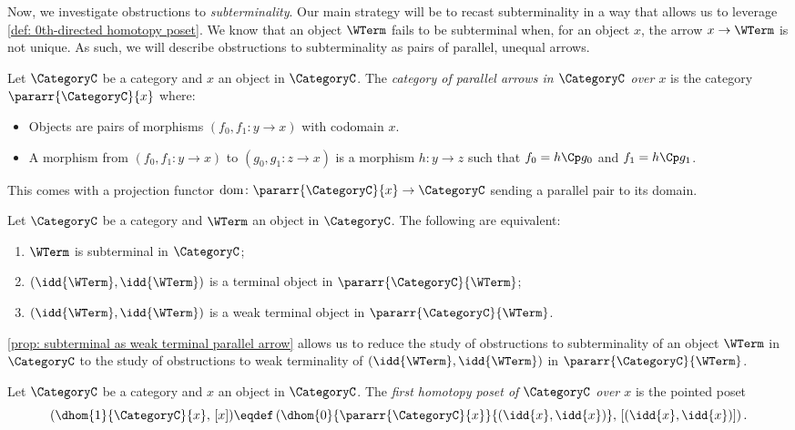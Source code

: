 Now, we investigate obstructions to \emph{subterminality}.
Our main strategy will be to recast subterminality in a way that allows us to leverage \autoref{def: 0th-directed homotopy poset}.
We know that an object $\WTerm$ fails to be subterminal when, for an object $x$, the arrow $x \to \WTerm$ is not unique.
As such, we will describe obstructions to subterminality as pairs of parallel, unequal arrows.
%
%
\begin{definition}\label{def: category of parallel arrows}
    Let $\CategoryC$ be a category and $x$ an object in $\CategoryC$.
    The \emph{category of parallel arrows in $\CategoryC$ over $x$} is the category $\pararr{\CategoryC}{x}$ where:
    \begin{itemize}
        \item Objects are pairs of morphisms $(f_0, f_1\colon y \to x)$ with codomain $x$.
        \item A morphism from $(f_0, f_1\colon y \to x)$ to $(g_0, g_1\colon z \to x)$ is a morphism $h\colon y \to z$ such that $f_0 = h\Cp g_0$ and $f_1 = h\Cp g_1$.
    \end{itemize}
    This comes with a projection functor $\mathrm{dom}\colon \pararr{\CategoryC}{x} \to \CategoryC$ sending a parallel pair to its domain.
\end{definition}
%
%    
\begin{proposition}\label{prop: subterminal as weak terminal parallel arrow}
    Let $\CategoryC$ be a category and $\WTerm$ an object in $\CategoryC$.
    The following are equivalent:
    \begin{enumerate}[label=(\alph*)]
        \item $\WTerm$ is subterminal in $\CategoryC$;
        \item $(\idd{\WTerm}, \idd{\WTerm})$ is a terminal object in $\pararr{\CategoryC}{\WTerm}$;
        \item $(\idd{\WTerm}, \idd{\WTerm})$ is a weak terminal object in $\pararr{\CategoryC}{\WTerm}$.
    \end{enumerate}
\end{proposition}
%
%
\autoref{prop: subterminal as weak terminal parallel arrow} allows us to reduce the study of obstructions to subterminality of an object $\WTerm$ in $\CategoryC$ to the study of obstructions to weak terminality of $(\idd{\WTerm}, \idd{\WTerm})$ in $\pararr{\CategoryC}{\WTerm}$. 
%
%
\begin{definition} \label{def: 1st-directed homotopy poset}
    Let $\CategoryC$ be a category and $x$ an object in $\CategoryC$.
    The \emph{first homotopy poset of $\CategoryC$ over $x$} is the pointed poset
    \begin{equation*}
        (\dhom{1}{\CategoryC}{x}, \, [x]) \eqdef \left(\dhom{0}{\pararr{\CategoryC}{x}}{(\idd{x}, \idd{x})}, \, [(\idd{x}, \idd{x})]\right).
    \end{equation*}
\end{definition}
